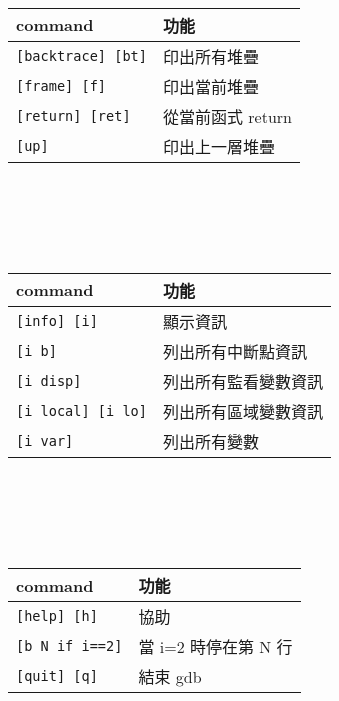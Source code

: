 \begin{center}
     \\
    \begin{tabular}{|p{2.7cm}|p{2.7cm}|}
        \hline
        command                         & 功能 \\
        \hline
        \verb|[backtrace] [bt]|         & 印出所有堆疊 \\
        \verb|[frame] [f]|              & 印出當前堆疊 \\
        \verb|[return] [ret]|           & 從當前函式 return \\
        \verb|[up]|                     & 印出上一層堆疊 \\
        \hline
    \end{tabular} \\
    \hspace{\fill} \\
    \hspace{\fill} \\

     \\
    \begin{tabular}{|p{2.7cm}|p{2.7cm}|}
        \hline
        command                         & 功能 \\
        \hline
        \verb|[info] [i]|               & 顯示資訊 \\
        \verb|[i b]|                    & 列出所有中斷點資訊 \\
        \verb|[i disp]|                 & 列出所有監看變數資訊 \\
        \verb|[i local] [i lo]|         & 列出所有區域變數資訊 \\
        \verb|[i var]|                  & 列出所有變數 \\
        \hline
    \end{tabular} \\
    \hspace{\fill} \\
    \hspace{\fill} \\

     \\
    \begin{tabular}{|p{2.7cm}|p{2.7cm}|}
        \hline
        command                         & 功能 \\
        \hline
        \verb|[help] [h]|               & 協助 \\
        \verb|[b N if i==2]|            & 當 i=2 時停在第 N 行 \\
        \verb|[quit] [q]|               & 結束 gdb \\
        \hline
    \end{tabular} \\
    \hspace{\fill} \\
    \hspace{\fill} \\


\end{center}
